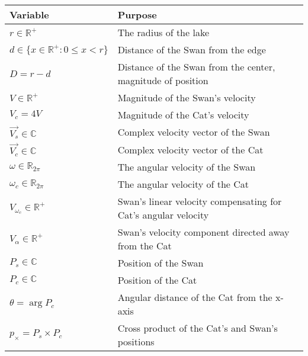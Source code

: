 \documentclass[12pt]{article}
\begin{document}
\begin{tabular}{|l|l|}
\hline
\textbf{Variable} & \textbf{Purpose}\\
\hline
$r \in {\mathbb{R}^+}$ & The radius of the lake\\
$d \in \{x \in \mathbb{R^+}: 0 \leq x < r \}$ & Distance of the Swan from the edge\\
$D = r - d$ & Distance of the Swan from the center, magnitude of position\\
$V \in {\mathbb{R}^+}$ & Magnitude of the Swan's velocity\\
$V_c = 4V$ & Magnitude of the Cat's velocity\\
$\vec{V_s} \in \mathbb{C}$ & Complex velocity vector of the Swan\\
$\vec{V_c} \in \mathbb{C}$ & Complex velocity vector of the Cat\\
$\omega \in \mathbb{R}_{2\pi}$ & The angular velocity of the Swan\\
$\omega_c \in \mathbb{R}_{2\pi}$ & The angular velocity of the Cat\\
$V_{\omega_c} \in \mathbb{R^+}$ & Swan's linear velocity compensating for Cat's angular velocity\\
$V_\alpha \in \mathbb{R^+}$ & Swan's velocity component directed away from the Cat\\
$P_s \in \mathbb{C}$ & Position of the Swan\\
$P_c \in \mathbb{C}$ & Position of the Cat\\
$\theta = \arg P_c$ & Angular distance of the Cat from the x-axis\\
$p_\times = P_s \times P_c$ & Cross product of the Cat's and Swan's positions\\
\hline
\end{tabular}
\vspace{12pt}



\end{document}
